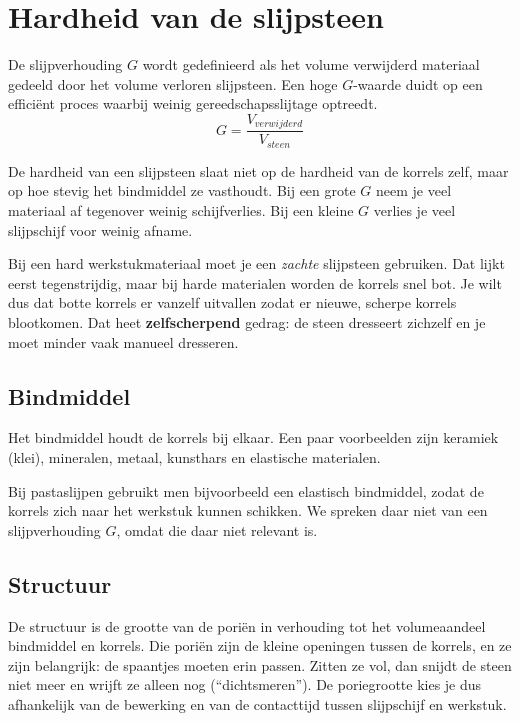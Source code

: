 \documentclass[a4paper,11pt,twoside]{report}
\begin{document}
\section{Hardheid van de slijpsteen}

\begin{conceptbox}
    De slijpverhouding $G$ wordt gedefinieerd als het volume verwijderd materiaal gedeeld door het volume verloren slijpsteen. Een hoge $G$-waarde duidt op een efficiënt proces waarbij weinig gereedschapsslijtage optreedt.
    \[ G = \frac{V_{verwijderd}}{V_{steen}} \]
\end{conceptbox}

De hardheid van een slijpsteen slaat niet op de hardheid van de korrels zelf, maar op hoe stevig het
bindmiddel ze vasthoudt.
Bij een grote $G$ neem je veel materiaal af tegenover weinig schijfverlies.
Bij een kleine $G$ verlies je veel slijpschijf voor weinig afname.

Bij een hard werkstukmateriaal moet je een \emph{zachte} slijpsteen gebruiken. Dat lijkt eerst tegenstrijdig,
maar bij harde materialen worden de korrels snel bot.
Je wilt dus dat botte korrels er vanzelf uitvallen zodat er nieuwe, scherpe korrels blootkomen.
Dat heet \textbf{zelfscherpend} gedrag: de steen dresseert zichzelf en je moet minder vaak manueel dresseren.
\subsection{Bindmiddel}
Het bindmiddel houdt de korrels bij elkaar.
Een paar voorbeelden zijn keramiek (klei), mineralen, metaal, kunsthars en elastische materialen.

Bij pastaslijpen gebruikt men bijvoorbeeld een elastisch bindmiddel, zodat de korrels zich naar het werkstuk
kunnen schikken. We spreken daar niet van een slijpverhouding $G$, omdat die daar niet relevant is.

\subsection{Structuur}
De structuur is de grootte van de poriën in verhouding tot het volumeaandeel bindmiddel en korrels.
Die poriën zijn de kleine openingen tussen de korrels, en ze zijn belangrijk: de spaantjes moeten erin passen.
Zitten ze vol, dan snijdt de steen niet meer en wrijft ze alleen nog (``dichtsmeren'').
De poriegrootte kies je dus afhankelijk van de bewerking en van de contacttijd tussen slijpschijf en werkstuk.
\end{document}
